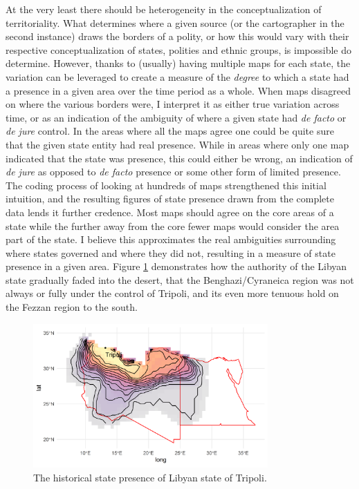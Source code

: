 \documentclass[12pt]{article}
\begin{document}
At the very least there should be heterogeneity in the conceptualization of
territoriality. What determines where a given source (or the cartographer in the
second instance) draws the borders of a polity, or how this would vary with
their respective conceptualization of states, polities and ethnic groups, is
impossible do determine. However, thanks to (usually) having multiple maps for
each state, the variation can be leveraged to create a measure of the
\textit{degree} to which a state had a presence in a given area over the time
period as a whole. When maps disagreed on where the various borders were, I
interpret it as either true variation across time, or as an indication of the
ambiguity of where a given state had \emph{de facto} or \emph{de jure} control.
In the areas where all the maps agree one could be quite sure that the given
state entity had real presence.  While in areas where only one map indicated
that the state was presence, this could either be wrong, an indication of
\emph{de jure} as opposed to \emph{de facto} presence or some other form of
limited presence. The coding process of looking at hundreds of maps strengthened
this initial intuition, and the resulting figures of state presence drawn from
the complete data lends it further credence. Most maps should agree on the core
areas of a state while the further away from the core fewer maps would consider
the area part of the state. I believe this approximates the real ambiguities
surrounding where states governed and where they did not, resulting in a measure
of state presence in a given area. Figure \ref{libya} demonstrates how the
authority of the Libyan state gradually faded into the desert, that the
Benghazi/Cyraneica region was not always or fully under the control of Tripoli,
and its even more tenuous hold on the Fezzan region to the south. 


\begin{figure}[htpb]
	\centering
	\includegraphics[width=0.8\textwidth,keepaspectratio]{img/libya.png}
	\caption{The historical state presence of Libyan state of Tripoli.}
	\label{libya}
\end{figure}
\end{document}
